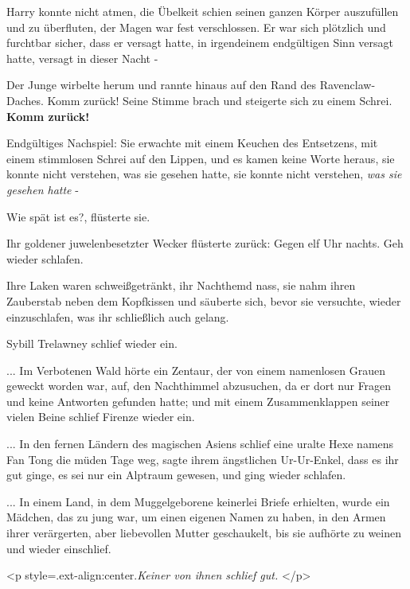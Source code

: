 Harry konnte nicht atmen, die Übelkeit schien seinen ganzen Körper auszufüllen
und zu überfluten, der Magen war fest verschlossen. Er war sich plötzlich und
furchtbar sicher, dass er versagt hatte, in irgendeinem endgültigen Sinn versagt
hatte, versagt in dieser Nacht -

Der Junge wirbelte herum und rannte hinaus auf den Rand des Ravenclaw-Daches.
\glqq Komm zurück!\grqq{} Seine Stimme brach und steigerte sich zu einem Schrei.
\glqq \textbf{Komm zurück!}\grqq{}


Endgültiges Nachspiel: Sie erwachte mit einem Keuchen des Entsetzens, mit einem
stimmlosen Schrei auf den Lippen, und es kamen keine Worte heraus, sie konnte
nicht verstehen, was sie gesehen hatte, sie konnte nicht verstehen, \emph{was
sie gesehen hatte} -

\glqq Wie spät ist es?\grqq{}, flüsterte sie.

Ihr goldener juwelenbesetzter Wecker flüsterte zurück: \glqq Gegen elf Uhr
nachts. Geh wieder schlafen.\grqq{}

Ihre Laken waren schweißgetränkt, ihr Nachthemd nass, sie nahm ihren Zauberstab
neben dem Kopfkissen und säuberte sich, bevor sie versuchte, wieder
einzuschlafen, was ihr schließlich auch gelang.

Sybill Trelawney schlief wieder ein.


... Im Verbotenen Wald hörte ein Zentaur, der von einem namenlosen Grauen
geweckt worden war, auf, den Nachthimmel abzusuchen, da er dort nur Fragen und
keine Antworten gefunden hatte; und mit einem Zusammenklappen seiner vielen
Beine schlief Firenze wieder ein.


... In den fernen Ländern des magischen Asiens schlief eine uralte Hexe namens
Fan Tong die müden Tage weg, sagte ihrem ängstlichen Ur-Ur-Enkel, dass es ihr
gut ginge, es sei nur ein Alptraum gewesen, und ging wieder schlafen.


... In einem Land, in dem Muggelgeborene keinerlei Briefe erhielten, wurde ein
Mädchen, das zu jung war, um einen eigenen Namen zu haben, in den Armen ihrer
verärgerten, aber liebevollen Mutter geschaukelt, bis sie aufhörte zu weinen und
wieder einschlief.


<p style=\grqq{}.ext-align:center\grqq{}.\emph{Keiner von ihnen schlief gut.
}</p>

